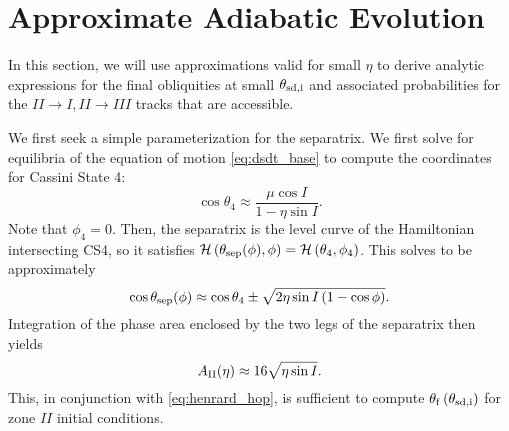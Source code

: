 \documentclass[
        fleqn,
        usenatbib,
        referee,
    ]{mnras}
\newcommand*{\p}[1]{\left(#1\right)}
\begin{document}
\section{Approximate Adiabatic Evolution}\label{s:ad_approx}

In this section, we will use approximations valid for small $\eta$ to derive
analytic expressions for the final obliquities at small $\theta_{\rm sd, i}$ and
associated probabilities for the $II \to I, II \to III$ tracks that are
accessible.

We first seek a simple parameterization for the separatrix. We first solve for
equilibria of the equation of motion \autoref{eq:dsdt_base} to compute the
coordinates for Cassini State 4:
\begin{equation}
    \cos \theta_4 \approx \frac{\mu \cos I}{1 - \eta \sin I}.
\end{equation}
Note that $\phi_4 = 0$. Then, the separatrix is the level curve of the
Hamiltonian intersecting CS4, so it satisfies $\mathcal{H}\p{\theta_{\rm
sep}(\phi), \phi} = \mathcal{H}\p{\theta_4, \phi_4}$. This solves to be
approximately
\begin{equation}
    \cos \theta_{\rm sep}(\phi) \approx \cos \theta_4 \pm
        \sqrt{2\eta \sin I\p{1 - \cos \phi}}.
\end{equation}
Integration of the phase area enclosed by the two legs of the separatrix then
yields
\begin{equation}
    A_{\rm II}(\eta) \approx 16\sqrt{\eta \sin I}.\label{eq:a_approx}
\end{equation}
This, in conjunction with \autoref{eq:henrard_hop}, is sufficient to compute
$\theta_{\rm f}\p{\theta_{\rm sd, i}}$ for zone $II$ initial conditions.
\end{document}
